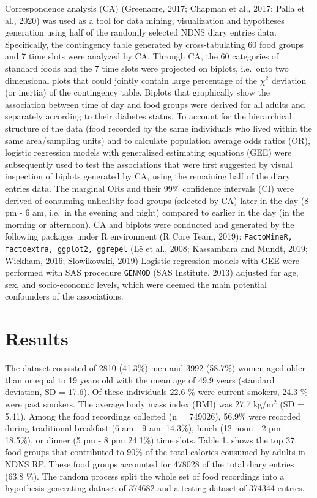 \documentclass[utf8]{frontiersSCNS}
\begin{document}
Correspondence analysis (CA) (Greenacre, 2017; Chapman et al., 2017;
Palla et al., 2020) was used as a tool for data mining, visualization
and hypotheses generation using half of the randomly selected NDNS diary
entries data. Specifically, the contingency table generated by
cross-tabulating 60 food groups and 7 time slots were analyzed by CA.
Through CA, the 60 categories of standard foods and the 7 time slots
were projected on biplots, i.e.~onto two dimensional plots that could
jointly contain large percentage of the \(\chi^2\) deviation (or
inertia) of the contingency table. Biplots that graphically show the
association between time of day and food groups were derived for all
adults and separately according to their diabetes status. To account for
the hierarchical structure of the data (food recorded by the same
individuals who lived within the same area/sampling units) and to
calculate population average odds ratios (OR), logistic regression
models with generalized estimating equations (GEE) were subsequently
used to test the associations that were first suggested by visual
inspection of biplots generated by CA, using the remaining half of the
diary entries data. The marginal ORs and their 99\% confidence intervals
(CI) were derived of consuming unhealthy food groups (selected by CA)
later in the day (8 pm - 6 am, i.e.~in the evening and night) compared
to earlier in the day (in the morning or afternoon). CA and biplots were
conducted and generated by the following packages under R environment (R
Core Team, 2019): \texttt{FactoMineR, factoextra, ggplot2, ggrepel} (Lê
et al., 2008; Kassambara and Mundt, 2019; Wickham, 2016; Slowikowski,
2019) Logistic regression models with GEE were performed with SAS
procedure \texttt{GENMOD} (SAS Institute, 2013) adjusted for age, sex,
and socio-economic levels, which were deemed the main potential
confounders of the associations.

\hypertarget{results}{%
\section*{Results}\label{results}}

The dataset consisted of 2810 (41.3\%) men and 3992 (58.7\%) women aged
older than or equal to 19 years old with the mean age of 49.9 years
(standard deviation, SD = 17.6). Of these individuals 22.6 \% were
current smokers, 24.3 \% were past smokers. The average body mass index
(BMI) was 27.7 kg/m\(^2\) (SD = 5.41). Among the food recordings
collected (n = 749026), 56.9\% were recorded during traditional
breakfast (6 am - 9 am: 14.3\%), lunch (12 noon - 2 pm: 18.5\%), or
dinner (5 pm - 8 pm: 24.1\%) time slots. Table 1. shows the top 37 food
groups that contributed to 90\% of the total calories consumed by adults
in NDNS RP. These food groups accounted for 478028 of the total diary
entries (63.8 \%). The random process split the whole set of food
recordings into a hypothesis generating dataset of 374682 and a testing
dataset of 374344 entries.
\end{document}
